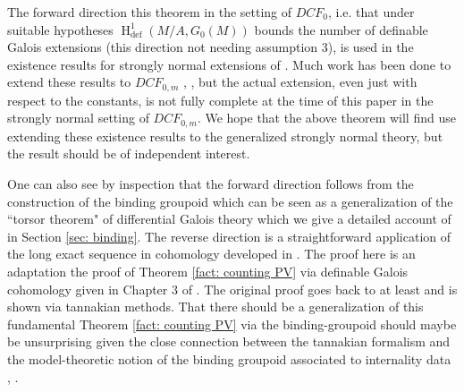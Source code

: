 \documentclass{amsart}
\theoremstyle{definition}
\theoremstyle{remark}
\numberwithin{equation}{section}
\def \defin {\operatorname{def}}
\def \HH {\operatorname{H}}
\def \diff {\operatorname{diff}}
\begin{document}

The forward direction this theorem in the setting of $DCF_0$, i.e. that under suitable hypotheses $\HH^1_{\defin}(M/A,G_0(M))$ bounds the number of definable Galois extensions (this direction not needing assumption 3), is used in the existence results for strongly normal extensions of \cite{KamenskyPillay}. Much work has been done to extend these results to $DCF_{0,m}$ \cite{omarronnie}, \cite{omaranandppv} \cite{OmarAnandDavid}, but the actual extension, even just with respect to the constants, is not fully complete at the time of this paper in the strongly normal setting of $DCF_{0,m}$. We hope that the above theorem will find use extending these existence results to the generalized strongly normal theory, but the result should be of independent interest.

One can also see by inspection that the forward direction follows from the construction of the binding groupoid which can be seen as a generalization of the ``torsor theorem" of differential Galois theory which we give a detailed account of in Section \ref{sec: binding}.  The reverse direction is a straightforward application of the long exact sequence in cohomology developed in \cite{OmarAnandDavid}. The proof here is an adaptation the proof of Theorem \ref{fact: counting PV} via definable Galois cohomology given in Chapter 3 of \cite{MeretzkyThesis}. The original proof goes back to at least \cite{DeligneMilne2022} and is shown via tannakian methods. That there should be a generalization of this fundamental Theorem \ref{fact: counting PV} via the binding-groupoid should maybe be unsurprising given the close connection between the tannakian formalism and the model-theoretic notion of the binding groupoid associated to internality data \cite{moshetannak}, \cite{KamenskyPillay}.


\end{document}
